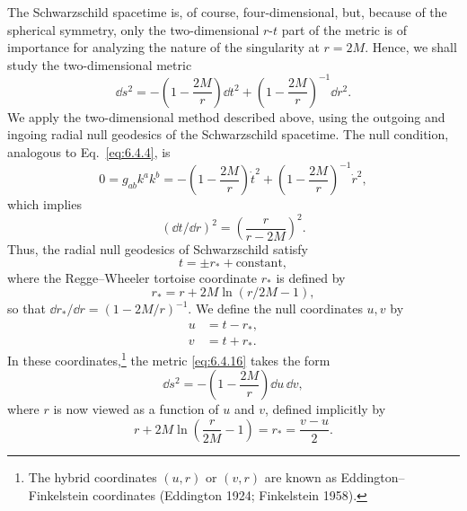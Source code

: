 The Schwarzschild spacetime is, of course, four-dimensional, but, because of the
spherical symmetry, only the two-dimensional \(r\)-\(t\) part of the metric is of
importance for analyzing the nature of the singularity at \(r=2M\). Hence, we
shall study the two-dimensional metric
\begin{equation}
  \dd s^2=-\left(1-\frac{2M}{r}\right)\dd t^2+
  \left(1-\frac{2M}{r}\right)^{-1}\dd r^2.
  \tag{6.4.16}\label{eq:6.4.16}
\end{equation}
We apply the two-dimensional method described above, using the outgoing and
ingoing radial null geodesics of the Schwarzschild spacetime. The null condition,
analogous to Eq.~\eqref{eq:6.4.4}, is
\begin{equation}
  0=g_{ab}k^ak^b
  =-\left(1-\frac{2M}{r}\right)\dot t^2+
  \left(1-\frac{2M}{r}\right)^{-1}\dot r^2,
  \tag{6.4.17}\label{eq:6.4.17}
\end{equation}
which implies
\begin{equation}
  (\dd t/\dd r)^2=\left(\frac{r}{r-2M}\right)^2.
  \tag{6.4.18}\label{eq:6.4.18}
\end{equation}
Thus, the radial null geodesics of Schwarzschild satisfy
\begin{equation}
  t=\pm r_*+\text{constant},
  \tag{6.4.19}\label{eq:6.4.19}
\end{equation}
where the Regge--Wheeler tortoise coordinate \(r_*\) is defined by
\begin{equation}
  r_*=r+2M\ln(r/2M-1),
  \tag{6.4.20}\label{eq:6.4.20}
\end{equation}
so that \(\dd r_*/\dd r=(1-2M/r)^{-1}\). We define the null coordinates \(u,v\) by
\begin{align}
  u&=t-r_*,
  &&\tag{6.4.21}\label{eq:6.4.21}\\
  v&=t+r_*.
  &&\tag{6.4.22}\label{eq:6.4.22}
\end{align}
In these coordinates,\footnote{The hybrid coordinates \((u,r)\) or \((v,r)\)
are known as Eddington--Finkelstein coordinates (Eddington 1924; Finkelstein
1958).} the metric \eqref{eq:6.4.16} takes the form
\begin{equation}
  \dd s^2=-\left(1-\frac{2M}{r}\right)\dd u\,\dd v,
  \tag{6.4.23}\label{eq:6.4.23}
\end{equation}
where \(r\) is now viewed as a function of \(u\) and \(v\), defined implicitly by
\begin{equation}
  r+2M\ln\left(\frac{r}{2M}-1\right)=r_*=\frac{v-u}{2}.
  \tag{6.4.24}\label{eq:6.4.24}
\end{equation}
